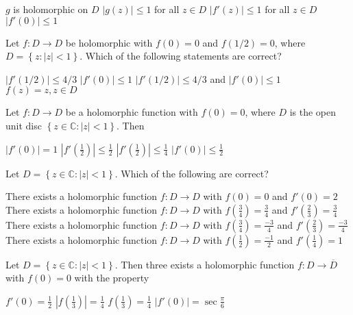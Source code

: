 \documentclass[10pt]{exam}
\newcommand{\C}{\ensuremath{\mathbb{C}}}
\newcommand{\set}[1]{\ensuremath{\left \{ {#1} \right \}}}
\newcommand{\smallb}[1]{\ensuremath{\left ( {#1} \right )}}
\begin{document}
\begin{questions}
\begin{checkboxes}
\choice $g$ is holomorphic on $D$ 
\choice $|g(z)| \leq 1$ for all $z \in D$ 
\choice $|f'(z)| \leq 1$ for all $z \in D$ 
\choice $|f'(0)| \leq 1$
\end{checkboxes}

\question 
Let $f:D \rightarrow D $ be holomorphic with $f(0) = 0$ and $f(1/2) = 0$, where $D = \set{z:|z|<1}$. Which of the following statements are correct?

\begin{oneparcheckboxes}
\choice $|f'(1/2)| \leq 4/3$ 
\choice $|f'(0)| \leq 1$ 
\choice $|f'(1/2)| \leq 4/3$ and  $|f'(0)| \leq 1$ 
\choice $f(z) = z , z \in D$ 
\end{oneparcheckboxes}


\question 
Let $f:D \rightarrow D$ be a holomorphic function with $f(0) = 0$, where $D$ is the open unit disc $\set{z \in \C: |z| < 1}$. Then

\begin{oneparchoices}
\choice $|f'(0)| = 1$
\choice $|f'\smallb{\frac{1}{2}}| \leq  \frac{1}{2}$
\choice $|f'\smallb{\frac{1}{2}}| \leq  \frac{1}{4}$
\choice $|f'\smallb{ 0 }| \leq  \frac{1}{2}$
\end{oneparchoices} 


\question 
Let $D = \set{z\in \C: |z| < 1}$. Which of the following are correct?

\begin{checkboxes}
\choice There exists a holomorphic function $f:D\rightarrow D$ with $f(0) = 0$ and $f'(0) = 2$ 
\choice There exists a holomorphic function $f:D\rightarrow D$ with $f \smallb{\frac{3}{4}} = \frac{3}{4}$ and $f'\smallb{\frac{2}{3}} = \frac{3}{4}$ 
\choice There exists a holomorphic function $f:D\rightarrow D$ with $f \smallb{\frac{3}{4}} = \frac{-3}{4}$ and $f'\smallb{\frac{2}{3}} = \frac{-3}{4}$ 
\choice There exists a holomorphic function $f:D\rightarrow D$ with $f \smallb{\frac{1}{2}} = \frac{-1}{2}$ and $f'\smallb{\frac{1}{4}} = 1$ 
\end{checkboxes}


\question 
Let $D = \set{z \in \C : |z| < 1}$. Then three exists a holomorphic function $f: D\rightarrow \overline{D}$ with $f(0) = 0$ with the property 

\begin{oneparcheckboxes}
\choice $f'(0) = \frac{1}{2}$
\choice $| f\smallb{\frac{1}{3}} | = \frac{1}{4}$
\choice $ f\smallb{\frac{1}{3}} = \frac{1}{4}$
\choice $|f'(0) |  = \sec \frac{\pi}{6}$
\end{oneparcheckboxes}



\end{questions}
\end{document}
